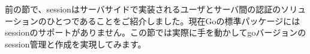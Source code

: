 前の節で、sessionはサーバサイドで実装されるユーザとサーバ間の認証のソリューションのひとつであることをご紹介しました。現在Goの標準パッケージにはsessionのサポートがありません。この節では実際に手を動かしてgoバージョンのsession管理と作成を実現してみます。
